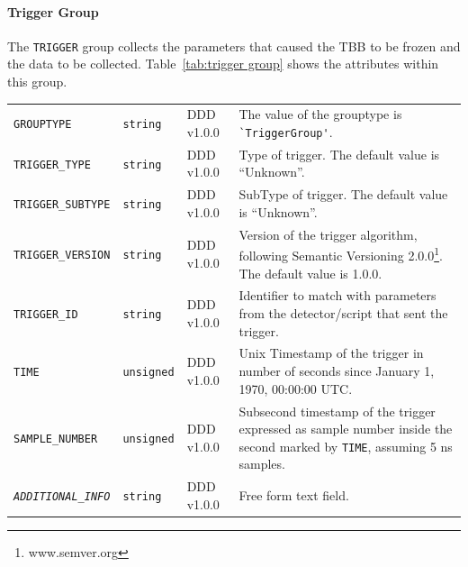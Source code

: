 \documentclass[a4paper,10pt,bibtotoc]{scrartcl}
\begin{document}
\paragraph{Trigger Group}

\label{sec:trigger group}

The \verb|TRIGGER| group collects the parameters that caused the TBB to be frozen and the data to be collected. Table~\ref{tab:trigger group} shows the attributes within this group.




\begin{center}
  \tablelasttail{
    \hline
  }
  \begin{supertabular}{|lllp{5.25cm}|}
    \small \texttt{GROUPTYPE} & \verb|string| & DDD v1.0.0 & The value of the grouptype is \verb|`TriggerGroup'|.\\
    \small \texttt{TRIGGER\_TYPE} & \verb|string| & DDD v1.0.0 & Type of trigger. The default value is ``Unknown''.\\
    \small \texttt{TRIGGER\_SUBTYPE} & \verb|string| & DDD v1.0.0 & SubType of trigger. The default value is ``Unknown''.\\
    \small \texttt{TRIGGER\_VERSION} & \verb|string| & DDD v1.0.0 & Version of the trigger algorithm, following Semantic Versioning 2.0.0\footnote{www.semver.org}. The default value is 1.0.0. \\
    \small \texttt{TRIGGER\_ID} & \verb|string| & DDD v1.0.0 & Identifier to match with parameters from the detector/script that sent the trigger. \\
    \small \texttt{TIME} & \verb|unsigned| & DDD v1.0.0 & Unix Timestamp of the trigger in number of seconds since January 1, 1970, 00:00:00 UTC.\\
    \small \texttt{SAMPLE\_NUMBER} & \verb|unsigned| & DDD v1.0.0 & Subsecond timestamp of the trigger expressed as sample number inside the second marked by \verb|TIME|, assuming 5 ns samples. \\
    \small \textit{\texttt{ADDITIONAL\_INFO}} & \verb|string| & DDD v1.0.0 & Free form text field. \\
    \hline
  \end{supertabular}
  \label{tab:trigger group}
\end{center}
\end{document}
